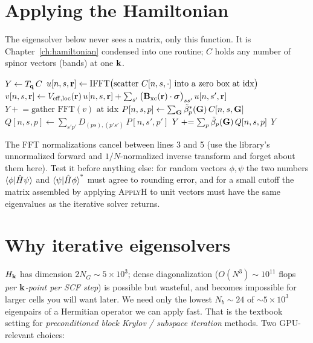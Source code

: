 \section{Applying the Hamiltonian}
\label{sec:applyh}

The eigensolver below never sees a matrix, only this function. It is
Chapter~\ref{ch:hamiltonian} condensed into one routine; $C$ holds any
number of spinor vectors (bands) at one $\kk$.

\begin{algorithm}[H]
\caption{Matrix-free Hamiltonian application at one $\kk$-point}
\label{alg:applyh}
\begin{algorithmic}[1]
\State $Y \gets T_{\mathbf{q}}\, C$ 
\State $u[n,s,\mathbf{r}] \gets \mathrm{IFFT}\big(\text{scatter } C[n,s,\cdot]
\text{ into a zero box at idx}\big)$ 
\State $v[n,s,\mathbf{r}] \gets V_{\mathrm{eff,loc}}(\mathbf{r})\,u[n,s,\mathbf{r}]
+ \sum_{s'}\big(\mathbf B_{\mathrm{xc}}(\mathbf{r})\cdot\bm\sigma\big)_{ss'}\,
u[n,s',\mathbf{r}]$ 
\State $Y \mathrel{+}= \text{gather } \mathrm{FFT}(v) \text{ at idx}$
\State $P[n,s,p] \gets \sum_{\mathbf{G}} \tilde\beta_p^{*}(\mathbf{G})\, C[n,s,\mathbf{G}]$
\State $Q[n,s,p] \gets \sum_{s'p'} D_{(p s),(p' s')}\, P[n,s',p']$
\State $Y \mathrel{+}= \sum_p \tilde\beta_p(\mathbf{G})\, Q[n,s,p]$
\State \Return $Y$
\EndFunction
\end{algorithmic}
\end{algorithm}

The FFT normalizations cancel between lines 3 and 5 (use the library's
unnormalized forward and $1/N$-normalized inverse transform and forget
about them here). Test it before anything else: for random vectors
$\phi,\psi$ the two numbers $\braket{\phi|\hat H\psi}$ and
$\braket{\psi|\hat H\phi}^*$ must agree to rounding error, and for a small
cutoff the matrix assembled by applying \textsc{ApplyH} to unit vectors
must have the same eigenvalues as the iterative solver returns.

\section{Why iterative eigensolvers}

$H_{\mathbf{k}}$ has dimension $2N_G \sim 5\times10^3$; dense diagonalization
($O(N^3) \sim 10^{11}$ flops \emph{per $\kk$-point per SCF step}) is possible
but wasteful, and becomes impossible for larger cells you will want later. We
need only the lowest $N_b \sim 24$ of $\sim 5\times10^3$ eigenpairs of a Hermitian
operator we can apply fast. That is the textbook setting for
\emph{preconditioned block Krylov / subspace iteration} methods. Two
GPU-relevant choices:

